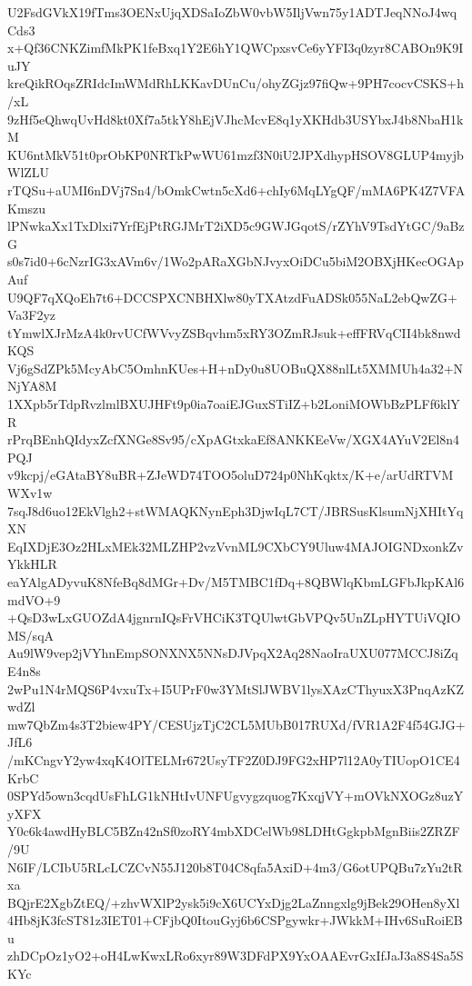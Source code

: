 U2FsdGVkX19fTms3OENxUjqXDSaIoZbW0vbW5IljVwn75y1ADTJeqNNoJ4wqCds3
x+Qf36CNKZimfMkPK1feBxq1Y2E6hY1QWCpxsvCe6yYFI3q0zyr8CABOn9K9IuJY
kreQikROqsZRIdcImWMdRhLKKavDUnCu/ohyZGjz97fiQw+9PH7cocvCSKS+h/xL
9zHf5eQhwqUvHd8kt0Xf7a5tkY8hEjVJhcMcvE8q1yXKHdb3USYbxJ4b8NbaH1kM
KU6ntMkV51t0prObKP0NRTkPwWU61mzf3N0iU2JPXdhypHSOV8GLUP4myjbWlZLU
rTQSu+aUMI6nDVj7Sn4/bOmkCwtn5cXd6+chIy6MqLYgQF/mMA6PK4Z7VFAKmszu
lPNwkaXx1TxDlxi7YrfEjPtRGJMrT2iXD5c9GWJGqotS/rZYhV9TsdYtGC/9aBzG
s0s7id0+6cNzrIG3xAVm6v/1Wo2pARaXGbNJvyxOiDCu5biM2OBXjHKecOGApAuf
U9QF7qXQoEh7t6+DCCSPXCNBHXlw80yTXAtzdFuADSk055NaL2ebQwZG+Va3F2yz
tYmwlXJrMzA4k0rvUCfWVvyZSBqvhm5xRY3OZmRJsuk+effFRVqCII4bk8nwdKQS
Vj6gSdZPk5McyAbC5OmhnKUes+H+nDy0u8UOBuQX88nlLt5XMMUh4a32+NNjYA8M
1XXpb5rTdpRvzlmlBXUJHFt9p0ia7oaiEJGuxSTiIZ+b2LoniMOWbBzPLFf6klYR
rPrqBEnhQIdyxZcfXNGe8Sv95/cXpAGtxkaEf8ANKKEeVw/XGX4AYuV2El8n4PQJ
v9kcpj/eGAtaBY8uBR+ZJeWD74TOO5oluD724p0NhKqktx/K+e/arUdRTVMWXv1w
7sqJ8d6uo12EkVlgh2+stWMAQKNynEph3DjwIqL7CT/JBRSusKlsumNjXHItYqXN
EqIXDjE3Oz2HLxMEk32MLZHP2vzVvnML9CXbCY9Uluw4MAJOIGNDxonkZvYkkHLR
eaYAlgADyvuK8NfeBq8dMGr+Dv/M5TMBC1fDq+8QBWlqKbmLGFbJkpKAl6mdVO+9
+QsD3wLxGUOZdA4jgnrnIQsFrVHCiK3TQUlwtGbVPQv5UnZLpHYTUiVQIOMS/sqA
Au9lW9vep2jVYhnEmpSONXNX5NNsDJVpqX2Aq28NaoIraUXU077MCCJ8iZqE4n8s
2wPu1N4rMQS6P4vxuTx+I5UPrF0w3YMtSlJWBV1lysXAzCThyuxX3PnqAzKZwdZl
mw7QbZm4s3T2biew4PY/CESUjzTjC2CL5MUbB017RUXd/fVR1A2F4f54GJG+JfL6
/mKCngvY2yw4xqK4OlTELMr672UsyTF2Z0DJ9FG2xHP7l12A0yTIUopO1CE4KrbC
0SPYd5own3cqdUsFhLG1kNHtIvUNFUgvygzquog7KxqjVY+mOVkNXOGz8uzYyXFX
Y0c6k4awdHyBLC5BZn42nSf0zoRY4mbXDCelWb98LDHtGgkpbMgnBiis2ZRZF/9U
N6IF/LCIbU5RLcLCZCvN55J120b8T04C8qfa5AxiD+4m3/G6otUPQBu7zYu2tRxa
BQjrE2XgbZtEQ/+zhvWXlP2ysk5i9cX6UCYxDjg2LaZnngxlg9jBek29OHen8yXl
4Hb8jK3fcST81z3IET01+CFjbQ0ItouGyj6b6CSPgywkr+JWkkM+IHv6SuRoiEBu
zhDCpOz1yO2+oH4LwKwxLRo6xyr89W3DFdPX9YxOAAEvrGxIfJaJ3a8S4Sa5SKYc

